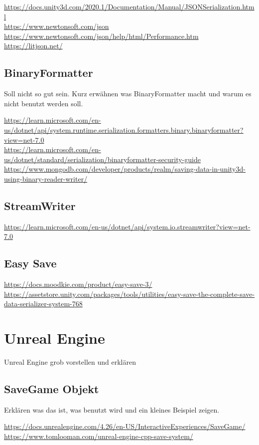 \url{https://docs.unity3d.com/2020.1/Documentation/Manual/JSONSerialization.html}\\
\url{https://www.newtonsoft.com/json}\\
\url{https://www.newtonsoft.com/json/help/html/Performance.htm}
\url{https://litjson.net/}

\subsection{BinaryFormatter}
Soll nicht so gut sein. Kurz erwähnen was BinaryFormatter macht und warum es nicht benutzt
werden soll.

\url{https://learn.microsoft.com/en-us/dotnet/api/system.runtime.serialization.formatters.binary.binaryformatter?view=net-7.0}\\
\url{https://learn.microsoft.com/en-us/dotnet/standard/serialization/binaryformatter-security-guide}\\
\url{https://www.mongodb.com/developer/products/realm/saving-data-in-unity3d-using-binary-reader-writer/}

\subsection{StreamWriter}
\url{https://learn.microsoft.com/en-us/dotnet/api/system.io.streamwriter?view=net-7.0}

\subsection{Easy Save}
\url{https://docs.moodkie.com/product/easy-save-3/}\\
\url{https://assetstore.unity.com/packages/tools/utilities/easy-save-the-complete-save-data-serializer-system-768}


\section{Unreal Engine}
Unreal Engine grob vorstellen und erklären

\subsection{SaveGame Objekt}
Erklären was das ist, was benutzt wird und ein kleines Beispiel zeigen.

\url{https://docs.unrealengine.com/4.26/en-US/InteractiveExperiences/SaveGame/}\\
\url{https://www.tomlooman.com/unreal-engine-cpp-save-system/}


